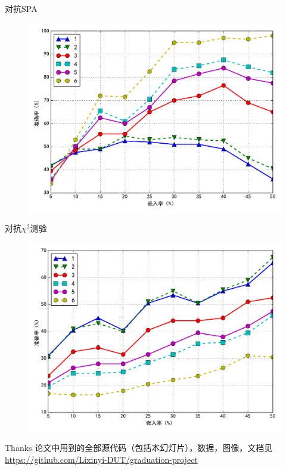\documentclass[14pt]{Bredelebeamer}
\begin{document}
\begin{frame}{对抗SPA}
	\begin{figure}
    \centering
		\includegraphics[width=.9\textwidth]{images/spaprediction}
	\end{figure}
\end{frame}

\begin{frame}{对抗$\chi^2$测验}
	\begin{figure}
    \centering
		\includegraphics[width=.9\textwidth]{images/chi2prediction}
	\end{figure}
\end{frame}

\begin{frame}{Thanks}
	\centering
	论文中用到的全部源代码（包括本幻灯片），数据，图像，文档见\\
	\faGithub \url{https://github.com/Lixinyi-DUT/graduation-project}
\end{frame}
\end{document}
